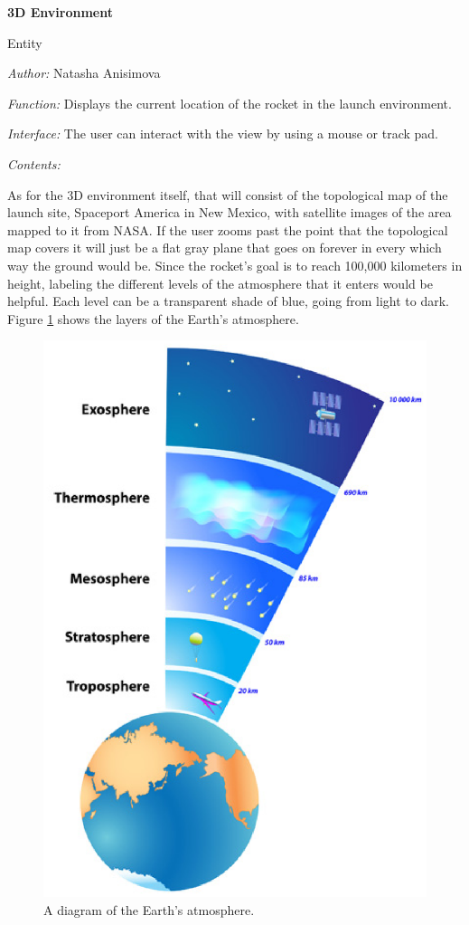 \documentclass[10pt,draftclsnofoot,onecolumn]{IEEEtran}
\newcommand{\newinterface}[5]{
	\begin{minipage}{\linewidth}
		\noindent\textbf{#2}
		
		\noindent Entity
		
		\noindent\textit{Author:} {#1}
		
		\noindent\textit{Function:} {#3}
		
		\noindent\textit{Interface:} {#4}		
		
		\noindent\textit{Contents:} {#5}
		\vspace{.5cm}
	\end{minipage}
}
\begin{document}
	\newinterface
	{Natasha Anisimova}
	{3D Environment}
	{Displays the current location of the rocket in the launch environment.}
	{The user can interact with the view by using a mouse or track pad.}
	{

		As for the 3D environment itself, that will consist of the topological map of the launch site, Spaceport America in New Mexico, with satellite images of the area mapped to it from NASA. If the user zooms past the point that the topological map covers it will just be a flat gray plane that goes on forever in every which way the ground would be. Since the rocket's goal is to reach 100,000 kilometers in height, labeling the different levels of the atmosphere that it enters would be helpful. Each level can be a transparent shade of blue, going from light to dark. Figure \ref{fig:2} shows the layers of the Earth's atmosphere.
	}
	\begin{center}
	\begin{figure}[htbp!]
		\centering\includegraphics[width = 120mm]{earth-atmosphere-layers.eps}
		\caption{A diagram of the Earth's atmosphere.}
		\label{fig:2}
	\end{figure}
	\end{center}
\end{document}
